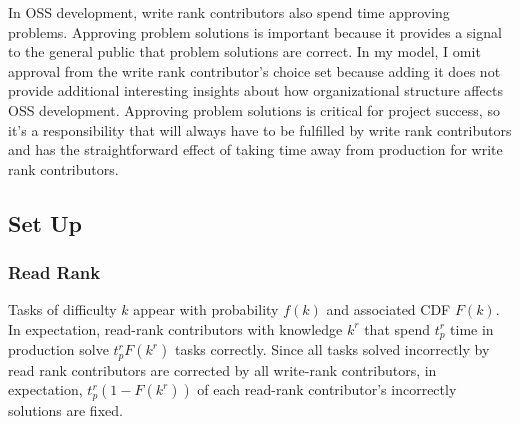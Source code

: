 \documentclass[source/paper/main.tex]{subfiles}
\begin{document}
\qquad In OSS development, write rank contributors also spend time approving problems. Approving problem solutions is important because it provides a signal to the general public that problem solutions are correct. In my model, I omit approval from the write rank contributor's choice set because adding it does not provide additional interesting insights about how organizational structure affects OSS development. Approving problem solutions is critical for project success, so it's a responsibility that will always have to be fulfilled by write rank contributors and has the straightforward effect of taking time away from production for write rank contributors.

\subsection{Set Up}
\subsubsection{Read Rank}
Tasks of difficulty $k$ appear with probability $f(k)$ and associated CDF $F(k)$. In expectation, read-rank contributors with knowledge $k^r$ that spend $t_p^r$ time in production solve $t_p^r F(k^r)$ tasks correctly. Since all tasks solved incorrectly by read rank contributors are corrected by all write-rank contributors, in expectation, $t_p^r (1-F(k^r))$ of each read-rank contributor's incorrectly solutions are fixed. 
\end{document}
